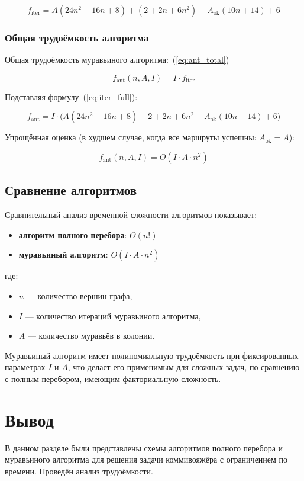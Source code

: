 \begin{equation}
	\label{eq:iter_full}
	f_{\text{iter}} = A(24n^2 - 16n + 8) + (2 + 2n + 6n^2) + A_{\text{ok}}(10n + 14) + 6
\end{equation}

\subsubsection{Общая трудоёмкость алгоритма}

Общая трудоёмкость муравьиного алгоритма:~(\ref{eq:ant_total})

\begin{equation}
	\label{eq:ant_total}
	f_{\text{ant}}(n, A, I) = I \cdot f_{\text{iter}}
\end{equation}

Подставляя формулу~(\ref{eq:iter_full}):

\begin{equation}
	f_{\text{ant}} = I \cdot \bigl(A(24n^2 - 16n + 8) + 2 + 2n + 6n^2 + A_{\text{ok}}(10n + 14) + 6\bigr)
	\label{eq:ant_full}
\end{equation}

Упрощённая оценка (в худшем случае, когда все маршруты успешны: $A_{\text{ok}} = A$):

\begin{equation}
	\label{eq:ant_simple}
	f_{\text{ant}}(n, A, I) = O(I \cdot A \cdot n^2)
\end{equation}

\subsection{Сравнение алгоритмов}

Сравнительный анализ временной сложности алгоритмов показывает:

\begin{itemize}
	\item \textbf{алгоритм полного перебора}: $\Theta(n!)$
	\item \textbf{муравьиный алгоритм}: $O(I \cdot A \cdot n^2)$
\end{itemize}

где:
\begin{itemize}
	\item $n$ --- количество вершин графа,
	\item $I$ --- количество итераций муравьиного алгоритма,
	\item $A$ --- количество муравьёв в колонии.
\end{itemize}

Муравьиный алгоритм имеет полиномиальную трудоёмкость при фиксированных параметрах $I$ и $A$, что делает его применимым для сложных задач, по сравнению с полным перебором, имеющим факториальную сложность.

\section*{Вывод}

В данном разделе были представлены схемы алгоритмов полного перебора и муравьиного алгоритма для решения задачи коммивояжёра с ограничением по времени. Проведён анализ трудоёмкости.

\clearpage
